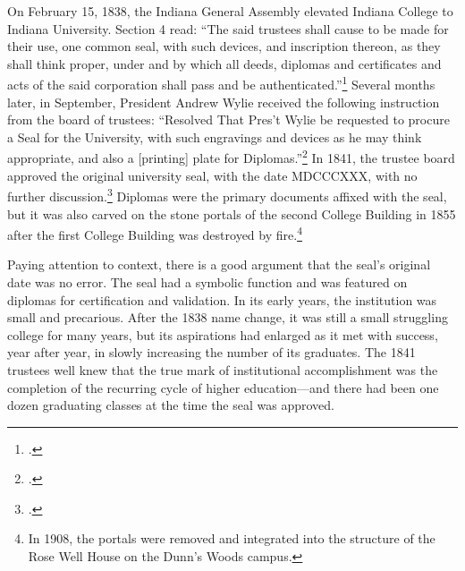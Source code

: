 \documentclass[
  american,
  letterpaper,
]{scrreprt}
\begin{document}
On February 15, 1838, the Indiana General Assembly elevated Indiana
College to Indiana University. Section 4 read: ``The said trustees shall
cause to be made for their use, one common seal, with such devices, and
inscription thereon, as they shall think proper, under and by which all
deeds, diplomas and certificates and acts of the said corporation shall
pass and be authenticated.''\footnote{.}
Several months later, in September, President Andrew Wylie received the
following instruction from the board of trustees: ``Resolved That Pres't
Wylie be requested to procure a Seal for the University, with such
engravings and devices as he may think appropriate, and also a
{[}printing{]} plate for Diplomas.''\footnote{.}
In 1841, the trustee board approved the original university seal, with
the date MDCCCXXX, with no further discussion.\footnote{.}
Diplomas were the primary documents affixed with the seal, but it was
also carved on the stone portals of the second College Building in 1855
after the first College Building was destroyed by fire.\footnote{In
  1908, the portals were removed and integrated into the structure of
  the Rose Well House on the Dunn's Woods campus.}

Paying attention to context, there is a good argument that the seal's
original date was no error. The seal had a symbolic function and was
featured on diplomas for certification and validation. In its early
years, the institution was small and precarious. After the 1838 name
change, it was still a small struggling college for many years, but its
aspirations had enlarged as it met with success, year after year, in
slowly increasing the number of its graduates. The 1841 trustees well
knew that the true mark of institutional accomplishment was the
completion of the recurring cycle of higher education---and there had
been one dozen graduating classes at the time the seal was approved.
\end{document}
